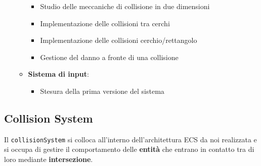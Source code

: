 \begin{itemize}
\begin{itemize}
                \begin{itemize}
                    \item Studio delle meccaniche di collisione in due dimensioni
                    \item Implementazione delle collisioni tra cerchi
                    \item Implementazione delle collisioni cerchio/rettangolo
                    \item Gestione del danno a fronte di una collisione
                \end{itemize}
            \item \textbf{Sistema di input}:
                   \begin{itemize}
                       \item Stesura della prima versione del sistema
                   \end{itemize}
                    
        \end{itemize}

\end{itemize}

\subsection{Collision System}

Il \texttt{collisionSystem} si colloca all'interno dell'architettura ECS da noi realizzata e si occupa di gestire il comportamento delle \textbf{entità} che entrano in contatto tra di loro mediante \textbf{intersezione}. 

